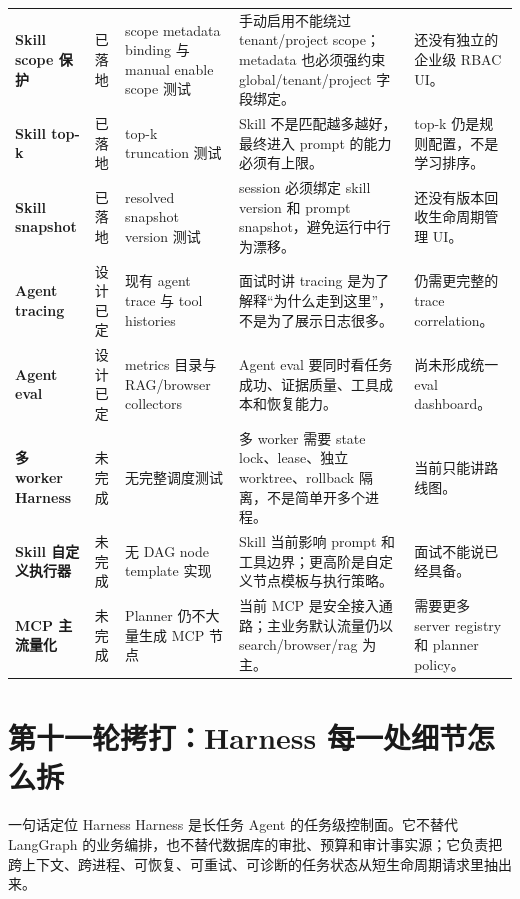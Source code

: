 \begin{longtable}{>{\bfseries}p{}p{}p{}p{}p{}}
Skill scope 保护 & 已落地 & scope metadata binding 与 manual enable scope 测试 & 手动启用不能绕过 tenant/project scope；metadata 也必须强约束 global/tenant/project 字段绑定。 & 还没有独立的企业级 RBAC UI。 \\
Skill top-k & 已落地 & top-k truncation 测试 & Skill 不是匹配越多越好，最终进入 prompt 的能力必须有上限。 & top-k 仍是规则配置，不是学习排序。 \\
Skill snapshot & 已落地 & resolved snapshot version 测试 & session 必须绑定 skill version 和 prompt snapshot，避免运行中行为漂移。 & 还没有版本回收生命周期管理 UI。 \\
Agent tracing & 设计已定 & 现有 agent trace 与 tool histories & 面试时讲 tracing 是为了解释“为什么走到这里”，不是为了展示日志很多。 & 仍需更完整的 trace correlation。 \\
Agent eval & 设计已定 & metrics 目录与 RAG/browser collectors & Agent eval 要同时看任务成功、证据质量、工具成本和恢复能力。 & 尚未形成统一 eval dashboard。 \\
多 worker Harness & 未完成 & 无完整调度测试 & 多 worker 需要 state lock、lease、独立 worktree、rollback 隔离，不是简单开多个进程。 & 当前只能讲路线图。 \\
Skill 自定义执行器 & 未完成 & 无 DAG node template 实现 & Skill 当前影响 prompt 和工具边界；更高阶是自定义节点模板与执行策略。 & 面试不能说已经具备。 \\
MCP 主流量化 & 未完成 & Planner 仍不大量生成 MCP 节点 & 当前 MCP 是安全接入通路；主业务默认流量仍以 search/browser/rag 为主。 & 需要更多 server registry 和 planner policy。 \\
\bottomrule
\end{longtable}

\section{第十一轮拷打：Harness 每一处细节怎么拆}

\begin{summaryBox}{一句话定位 Harness}
Harness 是长任务 Agent 的任务级控制面。它不替代 LangGraph 的业务编排，也不替代数据库的审批、预算和审计事实源；它负责把跨上下文、跨进程、可恢复、可重试、可诊断的任务状态从短生命周期请求里抽出来。
\end{summaryBox}

